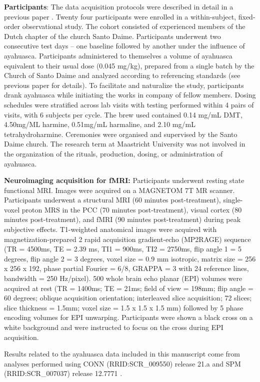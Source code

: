 \textbf{Participants}: The data acquisition protocols were described in
detail in a previous paper \parencite{Mallaroni2022}. Twenty four
participants were enrolled in a within-subject, fixed-order
observational study. The cohort consisted of experienced members of the
Dutch chapter of the church Santo Daime. Participants underwent two
consecutive test days -- one baseline followed by another under the
influence of ayahuasca. Participants administered to themselves a volume
of ayahuasca equivalent to their usual dose (0.045 mg/kg), prepared from
a single batch by the Church of Santo Daime and analyzed according to
referencing standards (see previous paper for details). To facilitate
and naturalize the study, participants drank ayahuasca while initiating
the works in company of fellow members. Dosing schedules were stratified
across lab visits with testing performed within 4 pairs of visits, with
6 subjects per cycle. The brew used contained 0.14 mg/mL DMT, 4.50mg/ML
harmine, 0.51mg/mL harmaline, and 2.10 mg/mL tetrahydroharmine.
Ceremonies were organised and supervised by the Santo Daime church. The
research term at Maastricht University was not involved in the
organization of the rituals, production, dosing, or administration of
ayahuasca.

\textbf{Neuroimaging acquisition for fMRI:} Participants underwent
resting state functional MRI. Images were acquired on a MAGNETOM 7T MR
scanner. Participants underwent a structural MRI (60 minutes
post-treatment), single-voxel proton MRS in the PCC (70 minutes
post-treatment), visual cortex (80 minutes post-treatment), and fMRI (90
minutes post-treatment) during peak subjective effects. T1-weighted
anatomical images were acquired with magnetization-prepared 2 rapid
acquisition gradient-echo (MP2RAGE) sequence (TR = 4500ms, TE = 2.39 ms,
TI1 = 900ms, TI2 = 2750ms, flip angle 1 = 5 degrees, flip angle 2 = 3
degrees, voxel size = 0.9 mm isotropic, matrix size = 256 x 256 x 192,
phase partial Fourier = 6/8, GRAPPA = 3 with 24 reference lines,
bandwidth = 250 Hz/pixel). 500 whole brain echo planar (EPI) volumes
were acquired at rest (TR = 1400ms; TE = 21ms; field of view = 198mm;
flip angle = 60 degrees; oblique acquisition orientation; interleaved
slice acquisition; 72 slices; slice thickness = 1.5mm; voxel size = 1.5
x 1.5 x 1.5 mm) followed by 5 phase encoding volumes for EPI unwarping.
Participants were shown a black cross on a white background and were
instructed to focus on the cross during EPI acquisition.

Results related to the ayahuasca data included in this manuscript come
from analyses performed using CONN (RRID:SCR\_009550) release 21.a and
SPM (RRID:SCR\_007037) release 12.7771 \parencite{Nieto-Castanon2022,Penny2007,Whitfield-Gabrieli2012} .

